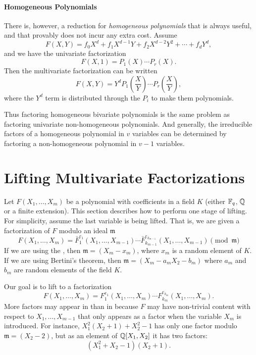 \paragraph{Homogeneous Polynomials}

There is, however, a reduction for {\em homogeneous
polynomials} that is always useful, and
that provably does not incur any extra cost.  Assume
\[
F(X, Y) = f_0 X^d + f_1 X^{d-1} Y + f_2 X^{d-2} Y^2 + \cdots + f_d
Y^d,
\]
and we have the univariate factorization 
\[
F(X, 1) = P_1(X) \cdots P_r(X).
\]
Then the multivariate factorization can be written
\[
F(X, Y) = Y^d P_1(\frac{X}{Y}) \cdots P_r(\frac{X}{Y}),
\]
where the $Y^d$ term is distributed through the $P_i$ to make them
polynomials.

Thus factoring homogeneous bivariate polynomials is the same problem
as factoring univariate non-homogeneous polynomials.  And generally,
the irreducible factors of a homogeneous polynomial in $v$ variables
can be determined by factoring a non-homogeneous polynomial in $v-1$
variables.

\section{Lifting Multivariate Factorizations}
\label{GF:Lift:Sec}

Let $F(X_1, \ldots, X_m)$ be a polynomial with coefficients in a field
$K$ (either $\mathbb{F}_q$, $\mathbb{Q}$ or a finite extension).  This section
describes how to perform one stage of lifting.  For simplicity, assume
the last variable is being lifted.  That is, we are given a
factorization of $F$ modulo an ideal $\mathfrak{m}$
\begin{equation} \label{GF:ModFact:Eq}
F(X_1, \ldots, X_m) = \bar{F}_1^{e_1}(X_1, \ldots, X_{m-1}) \cdots \bar{F}_{k_{m-1}}^{e_{k_{m-1}}}(X_1, \ldots, X_{m-1}) 
\pmod\mathfrak{m}
\end{equation}
If we are using the , then $\mathfrak{m} = (X_m - x_m)$, where $x_m$ is a random element of $K$.  If we are
using Bertini's theorem, then $\mathfrak{m} = (X_m - a_m X_2 - b_m)$
where $a_m$ and $b_m$ are random elements of the field $K$.

Our goal is to lift  to a factorization
\begin{equation} \label{GF:LiftedFact:Eq}
F(X_1, \ldots, X_m) = F_1^{e_1}(X_1, \ldots, X_{m}) \cdots
 F_{k_m}^{e_{k_m}}(X_1, \ldots, X_{m}). 
\end{equation}
More factors may appear in  than in
 because $F$ may have non-trivial content with
respect to $X_1, \ldots, X_{m-1}$ that only appears as a factor when
the variable $X_m$ is introduced.  For instance, $X_1^2(X_2+1) + X_2^2
-1$ has only one factor modulo $\mathfrak{m} = (X_2 - 2)$, but as an
element of $\mathbb{Q}[X_1, X_2]$ it has two factors:
\[
(X_1^2 + X_2 - 1) (X_2 + 1).
\]


